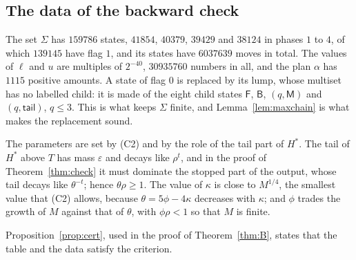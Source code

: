 \documentclass[11pt]{amsart}
\theoremstyle{definition}
\numberwithin{equation}{section}
\newcommand{\eps}{\varepsilon}
\begin{document}
\subsection{The data of the backward check}
The set $\Sigma$ has $159786$ states, $41854$, $40379$, $39429$ and $38124$ in phases $1$ to $4$, of which $139145$ have flag $1$, and its states have $6037639$ moves in total. The values of $\ell$ and $u$ are multiples of $2^{-40}$, $30935760$ numbers in all, and the plan $\alpha$ has $1115$ positive amounts. A state of flag $0$ is replaced by its lump, whose multiset has no labelled child: it is made of the eight child states $\mathsf F$, $\mathsf B$, $(q,\mathsf M)$ and $(q,\mathsf{tail})$, $q\le3$. This is what keeps $\Sigma$ finite, and Lemma~\ref{lem:maxchain} is what makes the replacement sound.

The parameters are set by (C2) and by the role of the tail part of $H^*$. The tail of $H^*$ above $T$ has mass $\eps$ and decays like $\rho^t$, and in the proof of Theorem~\ref{thm:check} it must dominate the stopped part of the output, whose tail decays like $\theta^{-t}$; hence $\theta\rho\ge1$. The value of $\kappa$ is close to $M^{1/4}$, the smallest value that (C2) allows, because $\theta=5\phi-4\kappa$ decreases with $\kappa$; and $\phi$ trades the growth of $M$ against that of $\theta$, with $\phi\rho<1$ so that $M$ is finite.

Proposition~\ref{prop:cert}, used in the proof of Theorem~\ref{thm:B}, states that the table and the data satisfy the criterion.
\end{document}
